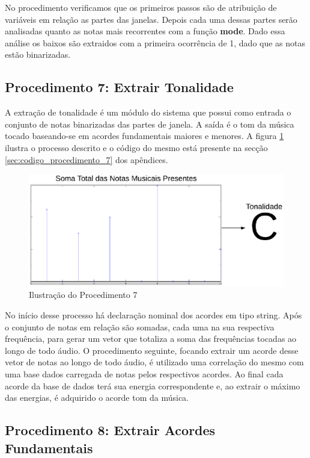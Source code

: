 No procedimento verificamos que os primeiros passos são de atribuição de variáveis em relação as partes das janelas. Depois cada uma dessas partes serão analisadas quanto as notas mais recorrentes com a função \textbf{mode}. Dado essa análise os baixos são extraidos com a primeira ocorrência de 1, dado que as notas estão binarizadas.

\subsection{Procedimento 7: Extrair Tonalidade}
\label{subsec:procedimento_7}

A extração de tonalidade é um módulo do sistema que possui como entrada o conjunto de notas binarizadas das partes de janela. A saída é o tom da música tocado baseando-se em acordes fundamentais maiores e menores. A figura \ref{fig:procedimento_7} ilustra o processo descrito e o código do mesmo está presente na secção \ref{sec:codigo_procedimento_7} dos apêndices. 

\begin{figure}[h] 
  \centering
    \includegraphics[keepaspectratio=true, scale=0.55]{figuras/procedimento_7}
    \caption{Ilustração do Procedimento 7}
    \label{fig:procedimento_7}
\end{figure}

No início desse processo há declaração nominal dos acordes em tipo string. Após o conjunto de notas em relação são somadas, cada uma na sua respectiva frequência, para gerar um vetor que totaliza a soma das frequências tocadas ao longo de todo áudio. O procedimento seguinte, focando extrair um acorde desse vetor de notas ao longo de todo áudio, é utilizado uma correlação do mesmo com uma base dados carregada de notas pelos respectivos acordes. Ao final cada acorde da base de dados terá sua energia correspondente e, ao extrair o máximo das energias, é adquirido o acorde tom da música.

\subsection{Procedimento 8: Extrair Acordes Fundamentais}
\label{subsec:procedimento_8}


